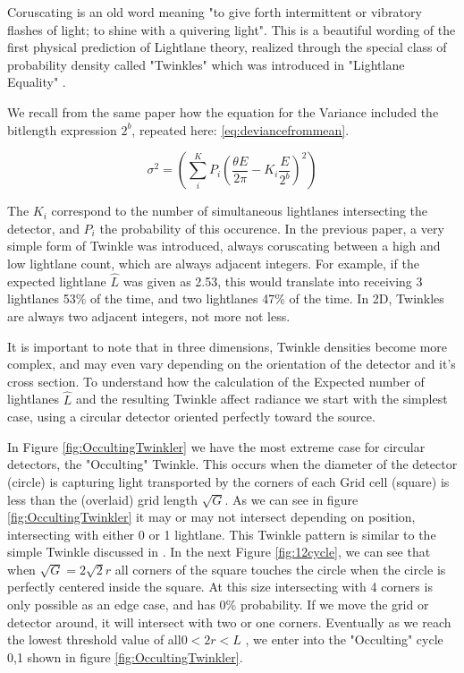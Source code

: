 \documentclass[notitlepage]{article}
\begin{document}
\begin{figure}
\end{figure}

Coruscating is an old word meaning "to give forth intermittent or vibratory flashes of light; to shine with a quivering light". This is a beautiful wording of the first physical prediction of Lightlane theory, realized through the special class of probability density called "Twinkles" which was introduced in "Lightlane Equality" \citep{RhadamantysA2}.

We recall from the same paper how the equation for the Variance included the bitlength expression $2^b$, repeated here: \eqref{eq:deviancefrommean}.

\begin{equation}
	\sigma^2 =  \left( \sum^K_i  P_i (\frac{\theta E }{2\pi} - K_i \frac{E}{2^b})^2\right)
	\label{eq:deviancefrommean}
\end{equation}


The $K_i$  correspond to the number of simultaneous lightlanes intersecting the detector, and $P_i$ the probability of this occurence. In the previous paper, a very simple form of Twinkle was introduced, always coruscating between a high and low lightlane count, which are always adjacent integers. For example, if the expected lightlane $\hat{L} $ was given as 2.53, this would translate into receiving 3 lightlanes 53\% of the time, and two lightlanes 47\% of the time. In 2D, Twinkles are always two adjacent integers, not more not less.

It is important to note that in three dimensions, Twinkle densities  become more complex, and may even vary depending on the orientation of the detector and it's cross section. To understand how the calculation of the Expected number of lightlanes $\hat{L}$ and the resulting Twinkle affect radiance we start with the simplest case, using a circular detector oriented perfectly toward the source. 

In Figure \ref{fig:OccultingTwinkler} we have the most extreme case for circular detectors, the "Occulting" Twinkle. This occurs when the diameter of the detector (circle) is capturing light transported by the corners of each Grid cell (square) is less than the (overlaid) grid length $\sqrt{G} $. As we can see in figure \ref{fig:OccultingTwinkler} it may or may not intersect depending on position, intersecting with either 0 or 1 lightlane. This Twinkle pattern is similar to the simple Twinkle discussed in \citep{RhadamantysA2}. In the next Figure \ref{fig:12cycle}, we can see that when  $ \sqrt{G} =2 \sqrt{2}r$ all corners of the square touches the circle when the circle is perfectly centered inside the square. At this size intersecting with 4 corners is only possible as an edge case, and has 0\% probability. If we move the grid or detector around, it will intersect with two or one corners. 
Eventually as we reach the lowest threshold value of all$ 0 <  2r < L $ ,  we enter into the "Occulting" cycle {0,1} shown in figure \ref{fig:OccultingTwinkler}.
\end{document}
